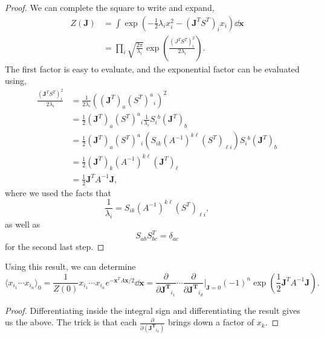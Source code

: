 \documentclass{article}
\numberwithin{equation}{section}
\begin{document}
\begin{proof}
    We can complete the square to write and expand,
    \begin{align*}
        Z(\bm{J}) &= \int \exp\left(-\frac{1}{2}\lambda_i x_i^2 - (\bm{J}^TS^T)_i x_i\right) \dd{\bm{x}} \\ 
        &= \prod_{i}\sqrt{\frac{2\pi}{\lambda_i}}\exp\left(\frac{(J^TS^T)_i^2}{2\lambda_i}\right).
    \end{align*}
    The first factor is easy to evaluate, and the exponential factor can be evaluated using,
    \begin{align*}
        \frac{(\bm{J}^TS^T)_i^2}{2\lambda_i} &= \frac{1}{2 \lambda_i}\left((\bm{J}^T)_a(S^T)^{a}{}_i\right)^2 \\ 
        &= \frac{1}{2}(\bm{J}^T)_a(S^T)^{a}{}_i \frac{1}{\lambda_i} S_{i}{}^b(\bm{J}^T)_{b} \\ 
        &= \frac{1}{2}(\bm{J}^T)_a(S^T)^{a}{}_i \left(S_{ik}(A^{-1})^{k\ell}(S^T)_{\ell i}\right) S_{i}{}^b(\bm{J}^T)_{b} \\ 
        &= \frac{1}{2}(\bm{J}^T)_k (A^{-1})^{k\ell} (\bm{J}^T)_{\ell} \\
        &= \frac{1}{2}\bm{J}^T A^{-1}\bm{J},
    \end{align*}
    where we used the facts that 
    \begin{equation*}
        \frac{1}{\lambda_i} = S_{ik}(A^{-1})^{k\ell}(S^T)_{\ell i},
    \end{equation*}
    as well as 
    \begin{equation*}
        S_{ab}S_{bc}^T = \delta_{ac}
    \end{equation*}
    for the second last step.
\end{proof}
Using this result, we can determine 
\begin{equation}
    \boxed{\langle x_{i_1}\cdots x_{i_n}\rangle_0 = \frac{1}{Z(0)}x_{i_1}\cdots x_{i_n}e^{-\bm{x}^TA\bm{x}/2}\dd{\bm{x}} = \frac{\partial}{\partial \bm{J^T}_{i_1}}\cdots \frac{\partial}{\partial \bm{J^T}_{i_d}} \bigg|_{\bm{J}=0} (-1)^n \exp\left(\frac{1}{2}\bm{J}^TA^{-1}\bm{J}\right).}
\end{equation}
\begin{proof}
    Differentiating inside the integral sign and differentiating the result gives us the above. The trick is that each $\frac{\partial}{\partial (\bm{J^T}_{i_k})}$ brings down a factor of $x_k.$
\end{proof}
\end{document}

